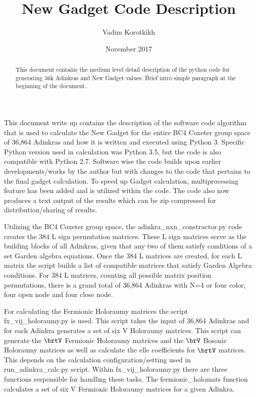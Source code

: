 \documentclass[12pt, letterpaper]{article}
\title{New Gadget Code Description}
\author{Vadim Korotkikh}
\date{November 2017}
\begin{document}
\maketitle

\begin{abstract}
This document contains the medium level detail description of the python code
for generating 36k Adinkras and New Gadget values. Brief intro simple paragraph
at the beginning of the document.
\end{abstract}

This document write up contains the description of the software code algorithm
that is used to calculate the New Gadget for the entire BC4 Coxeter group space
of 36,864 Adinkras and how it is written and executed using Python 3.
Specific Python version used in calculation was Python 3.5, but the code is also
compatible with Python 2.7.
Software wise the code builds upon earlier developments/works by the author but
with changes to the code that pertains to the final gadget calculation.
To speed up Gadget calculation, multiprocessing feature has been added and is
utilized within the code. The code also now produces a text output of the
results which can be zip compressed for distribution/sharing of results.\par
Utilizing the BC4 Coxeter group space, the adinkra{\_}nxn{\_}constructor.py
code creates the 384 L sign permutation matrices. These L sign matrices serve as the building
blocks of all Adinkras, given that any two of them satisfy conditions of a set Garden algebra
equations. Once the 384 L matrices are created, for each L matrix the script builds a list of
compatible matrices that satisfy Garden Algebra conditions. For 384 L matrices, counting all
possible matrix position permutations, there is a grand total of 36,864 Adinkras with N=4 or
four color, four open node and four close node.\par
For calculating the Fermionic Holoraumy matrices the script fx{\_}vij{\_}holoraumy.py is used.
This script takes the input of 36,864 Adinkras and for each Adinkra generates a set of six
V Holoraumy matrices. This script can generate the $\brtV$ Fermionic Holoraumy matrices and the
$\brV$ Bosonic Holoraumy matrices as well as calculate the elle coefficients for $\brtV$ matrices.
This depends on the calculation configuration/setting used in run{\_}adinkra{\_}calc.py
script. Within fx{\_}vij{\_}holoraumy.py there are three functions responsible for handling these tasks.
The fermionic{\_}holomats function calculates a set of six V Fermionic Holoraumy matrices for a
given Adinkra.
\end{document}
